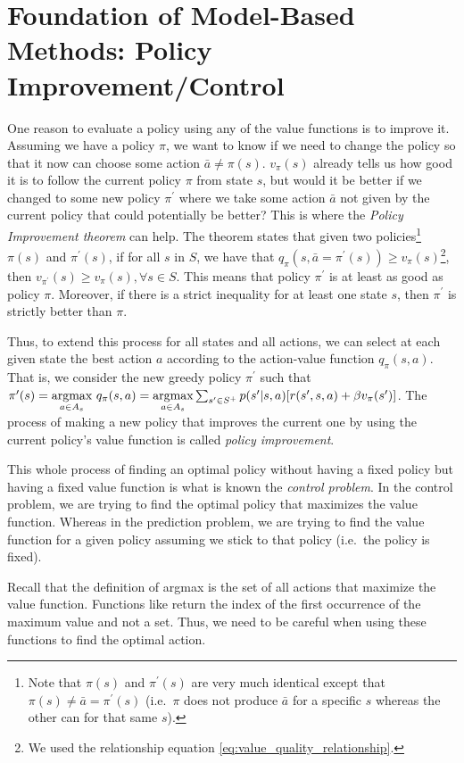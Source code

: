 \section*{Foundation of Model-Based Methods: Policy Improvement/Control}
One reason to evaluate a policy using any of the value functions is to improve it.
Assuming we have a policy $\pi$, we want to know if we need to change the policy so that it now can choose some action $\bar{a}\neq\pi(s)$.
$v_\pi(s)$ already tells us how good it is to follow the current policy $\pi$ from state $s$, but would it be better if we changed to some new policy $\pi^\prime$ where we take some action $\bar{a}$ not given by the current policy that could potentially be better?
This is where the \emph{Policy Improvement theorem} can help.
The theorem states that given two policies\footnote{Note that $\pi(s)$ and $\pi^\prime(s)$ are very much identical except that $\pi(s)\neq\bar{a}=\pi^\prime(s)$ (i.e.\ $\pi$ does not produce $\bar{a}$ for a specific $s$ whereas the other can for that same $s$).} $\pi(s)$ and $\pi^\prime(s)$, if for all $s$ in $S$, we have that $q_\pi(s,\bar{a}=\pi^\prime(s))\geq v_\pi(s)$\footnote{We used the relationship equation \ref{eq:value_quality_relationship}.}, then $v_{\pi^\prime}(s)\geq v_\pi(s), \forall s\in S$.
This means that policy $\pi^\prime$ is at least as good as policy $\pi$.
Moreover, if there is a strict inequality for at least one state $s$, then $\pi^\prime$ is strictly better than $\pi$.

Thus, to extend this process for all states and all actions, we can select at each given state the best action $a$ according to the action-value function $q_\pi(s,a)$.
That is, we consider the new greedy policy $\pi^\prime$ such that $\pi^\prime(s)=\underset{a\in A_s}{\mbox{argmax}}\text{ } q_\pi(s,a)= \underset{a\in A_s}{\mbox{argmax}} \sum_{s^\prime\in S^+} p(s^\prime|s,a)[r(s^\prime,s,a)+\beta v_{\pi}(s^\prime)]$.
The process of making a new policy that improves the current one by using the current policy's value function is called \emph{policy improvement}.

This whole process of finding an optimal policy without having a fixed policy but having a fixed value function is what is known the \emph{control problem}.
In the control problem, we are trying to find the optimal policy that maximizes the value function.
Whereas in the prediction problem, we are trying to find the value function for a given policy assuming we stick to that policy (i.e.\ the policy is fixed).

\begin{warn}
    Recall that the definition of argmax is the set of all actions that maximize the value function.
    Functions like  return the index of the first occurrence of the maximum value and not a set.
    Thus, we need to be careful when using these functions to find the optimal action.
\end{warn}

